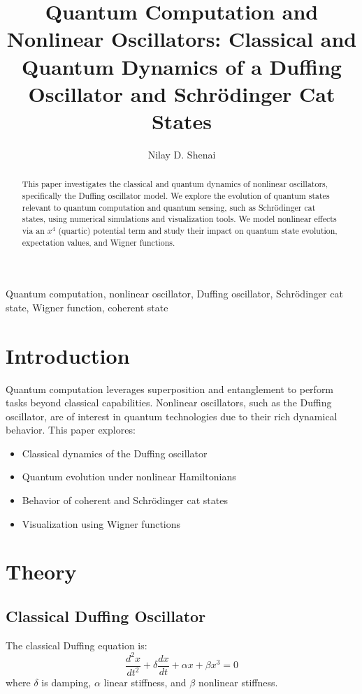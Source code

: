 \documentclass[conference]{IEEEtran}
\title{Quantum Computation and Nonlinear Oscillators: Classical and Quantum Dynamics of a Duffing Oscillator and Schr\"odinger Cat States}
\author{Nilay D. Shenai}
\begin{document}
\maketitle

\begin{abstract}
This paper investigates the classical and quantum dynamics of nonlinear oscillators, specifically the Duffing oscillator model. We explore the evolution of quantum states relevant to quantum computation and quantum sensing, such as Schr\"odinger cat states, using numerical simulations and visualization tools. We model nonlinear effects via an $x^4$ (quartic) potential term and study their impact on quantum state evolution, expectation values, and Wigner functions.
\end{abstract}

\begin{IEEEkeywords}
Quantum computation, nonlinear oscillator, Duffing oscillator, Schr\"odinger cat state, Wigner function, coherent state
\end{IEEEkeywords}

\section{Introduction}
Quantum computation leverages superposition and entanglement to perform tasks beyond classical capabilities. Nonlinear oscillators, such as the Duffing oscillator, are of interest in quantum technologies due to their rich dynamical behavior. This paper explores:
\begin{itemize}
    \item Classical dynamics of the Duffing oscillator
    \item Quantum evolution under nonlinear Hamiltonians
    \item Behavior of coherent and Schr\"odinger cat states
    \item Visualization using Wigner functions
\end{itemize}

\section{Theory}
\subsection{Classical Duffing Oscillator}
The classical Duffing equation is:
\begin{equation}
    \frac{d^2x}{dt^2} + \delta \frac{dx}{dt} + \alpha x + \beta x^3 = 0
\end{equation}
where $\delta$ is damping, $\alpha$ linear stiffness, and $\beta$ nonlinear stiffness.
\end{document}
